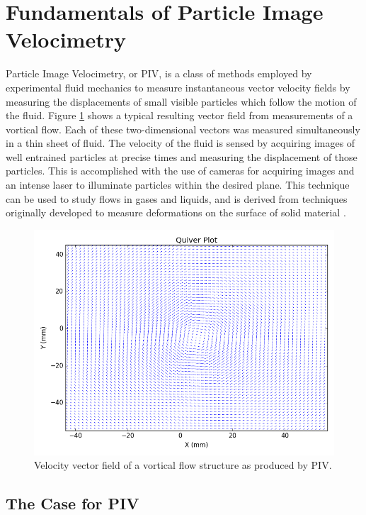 \section{Fundamentals of Particle Image Velocimetry}

Particle Image Velocimetry, or PIV, is a class of methods employed by 
experimental fluid mechanics to measure instantaneous vector velocity fields by 
measuring the displacements of small visible particles which follow the motion 
of the fluid. Figure \ref{fig:quiver_example} shows a typical 
resulting vector field from measurements of a vortical flow. Each of these 
two-dimensional vectors was measured simultaneously in a thin sheet of fluid. 
The velocity of the fluid is sensed by acquiring images of well entrained 
particles at precise times and measuring the displacement of those particles. 
This is accomplished with the use of cameras for acquiring images and an 
intense laser to illuminate particles within the desired plane. 
This technique can be used to study flows in gases and liquids, and is derived 
from techniques originally developed to measure deformations on the surface of 
solid material \cite{arroyo1991,adrian1991}.

\begin{figure}[H]
	\centering
	\includegraphics[width=5in]{figs/example_vortex_figs/example_quiver}
	\caption{Velocity vector field of a vortical flow structure as produced by 
	PIV.}
	\label{fig:quiver_example}
\end{figure}

 
\subsection{The Case for PIV}

